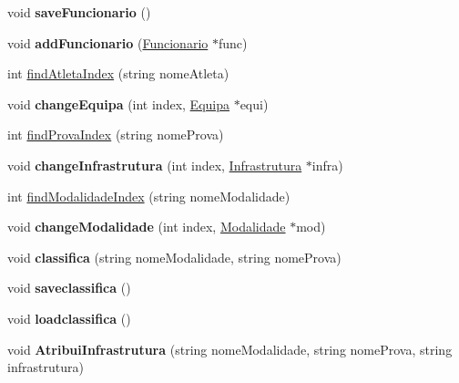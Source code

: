 \begin{DoxyCompactItemize}
\item 
\hypertarget{class_campeonato_a512ae39e1ccd4f5ef1d63a5cbba70533}{}void {\bfseries save\+Funcionario} ()\label{class_campeonato_a512ae39e1ccd4f5ef1d63a5cbba70533}

\item 
\hypertarget{class_campeonato_a69850f368a571f1c4a3f41a8cdf9134d}{}void {\bfseries add\+Funcionario} (\hyperlink{class_funcionario}{Funcionario} $\ast$func)\label{class_campeonato_a69850f368a571f1c4a3f41a8cdf9134d}

\item 
int \hyperlink{class_campeonato_a66b8999b519c0d332454eb5aa8e52f58}{find\+Atleta\+Index} (string nome\+Atleta)
\item 
\hypertarget{class_campeonato_a22ef72d5e68e7ad752c1f50b7c75bed3}{}void {\bfseries change\+Equipa} (int index, \hyperlink{class_equipa}{Equipa} $\ast$equi)\label{class_campeonato_a22ef72d5e68e7ad752c1f50b7c75bed3}

\item 
int \hyperlink{class_campeonato_a9d4fafde7ccc993491653808073bfbe9}{find\+Prova\+Index} (string nome\+Prova)
\item 
\hypertarget{class_campeonato_a459af23f81e62238fda6c0fb2f5899c6}{}void {\bfseries change\+Infrastrutura} (int index, \hyperlink{class_infrastrutura}{Infrastrutura} $\ast$infra)\label{class_campeonato_a459af23f81e62238fda6c0fb2f5899c6}

\item 
int \hyperlink{class_campeonato_a621b57918dd641742b1bdb127d00ae9a}{find\+Modalidade\+Index} (string nome\+Modalidade)
\item 
\hypertarget{class_campeonato_aa36651ab3d9d5719544c87d73fb69f8d}{}void {\bfseries change\+Modalidade} (int index, \hyperlink{class_modalidade}{Modalidade} $\ast$mod)\label{class_campeonato_aa36651ab3d9d5719544c87d73fb69f8d}

\item 
\hypertarget{class_campeonato_a77820e96721d4a0dfcaef5dcdec2792c}{}void {\bfseries classifica} (string nome\+Modalidade, string nome\+Prova)\label{class_campeonato_a77820e96721d4a0dfcaef5dcdec2792c}

\item 
\hypertarget{class_campeonato_a16d66166b3addf4f1dc21772b49c8340}{}void {\bfseries saveclassifica} ()\label{class_campeonato_a16d66166b3addf4f1dc21772b49c8340}

\item 
\hypertarget{class_campeonato_af408d39d887fcab1bad83b7d003acdb3}{}void {\bfseries loadclassifica} ()\label{class_campeonato_af408d39d887fcab1bad83b7d003acdb3}

\item 
\hypertarget{class_campeonato_a6d18e304117b1109bb80fc9f96345130}{}void {\bfseries Atribui\+Infrastrutura} (string nome\+Modalidade, string nome\+Prova, string infrastrutura)\label{class_campeonato_a6d18e304117b1109bb80fc9f96345130}

\end{DoxyCompactItemize}


